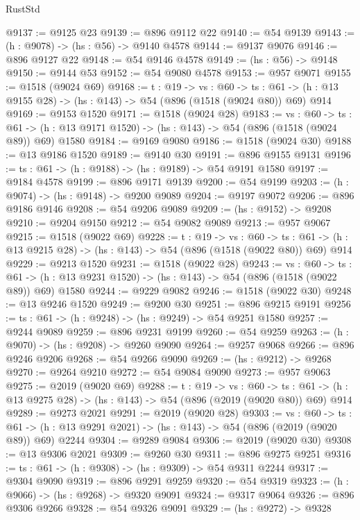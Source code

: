 \begin{lexlean}{RustStd}
\begin{coremodule}
@9137 := @9125 @23
@9139 := @896 @9112 @22
@9140 := @54 @9139
@9143 := (h : @9078) -> (hs : @56) -> @9140 @4578
@9144 := @9137 @9076
@9146 := @896 @9127 @22
@9148 := @54 @9146 @4578
@9149 := (hs : @56) -> @9148
@9150 := @9144 @53
@9152 := @54 @9080 @4578
@9153 := @957 @9071
@9155 := @1518 (@9024 @69)
@9168 := {t : @19} ->
  {vs : @60} ->
  {ts : @61} -> (h : @13 @9155 @28) -> (hs : @143) -> @54 (@896 (@1518 (@9024 @80)) @69) @914
@9169 := @9153 @1520
@9171 := @1518 (@9024 @28)
@9183 := {vs : @60} ->
  {ts : @61} -> (h : @13 @9171 @1520) -> (hs : @143) -> @54 (@896 (@1518 (@9024 @89)) @69) @1580
@9184 := @9169 @9080
@9186 := @1518 (@9024 @30)
@9188 := @13 @9186 @1520
@9189 := @9140 @30
@9191 := @896 @9155 @9131
@9196 := {ts : @61} -> (h : @9188) -> (hs : @9189) -> @54 @9191 @1580
@9197 := @9184 @4578
@9199 := @896 @9171 @9139
@9200 := @54 @9199
@9203 := (h : @9074) -> (hs : @9148) -> @9200 @9089
@9204 := @9197 @9072
@9206 := @896 @9186 @9146
@9208 := @54 @9206 @9089
@9209 := (hs : @9152) -> @9208
@9210 := @9204 @9150
@9212 := @54 @9082 @9089
@9213 := @957 @9067
@9215 := @1518 (@9022 @69)
@9228 := {t : @19} ->
  {vs : @60} ->
  {ts : @61} -> (h : @13 @9215 @28) -> (hs : @143) -> @54 (@896 (@1518 (@9022 @80)) @69) @914
@9229 := @9213 @1520
@9231 := @1518 (@9022 @28)
@9243 := {vs : @60} ->
  {ts : @61} -> (h : @13 @9231 @1520) -> (hs : @143) -> @54 (@896 (@1518 (@9022 @89)) @69) @1580
@9244 := @9229 @9082
@9246 := @1518 (@9022 @30)
@9248 := @13 @9246 @1520
@9249 := @9200 @30
@9251 := @896 @9215 @9191
@9256 := {ts : @61} -> (h : @9248) -> (hs : @9249) -> @54 @9251 @1580
@9257 := @9244 @9089
@9259 := @896 @9231 @9199
@9260 := @54 @9259
@9263 := (h : @9070) -> (hs : @9208) -> @9260 @9090
@9264 := @9257 @9068
@9266 := @896 @9246 @9206
@9268 := @54 @9266 @9090
@9269 := (hs : @9212) -> @9268
@9270 := @9264 @9210
@9272 := @54 @9084 @9090
@9273 := @957 @9063
@9275 := @2019 (@9020 @69)
@9288 := {t : @19} ->
  {vs : @60} ->
  {ts : @61} -> (h : @13 @9275 @28) -> (hs : @143) -> @54 (@896 (@2019 (@9020 @80)) @69) @914
@9289 := @9273 @2021
@9291 := @2019 (@9020 @28)
@9303 := {vs : @60} ->
  {ts : @61} -> (h : @13 @9291 @2021) -> (hs : @143) -> @54 (@896 (@2019 (@9020 @89)) @69) @2244
@9304 := @9289 @9084
@9306 := @2019 (@9020 @30)
@9308 := @13 @9306 @2021
@9309 := @9260 @30
@9311 := @896 @9275 @9251
@9316 := {ts : @61} -> (h : @9308) -> (hs : @9309) -> @54 @9311 @2244
@9317 := @9304 @9090
@9319 := @896 @9291 @9259
@9320 := @54 @9319
@9323 := (h : @9066) -> (hs : @9268) -> @9320 @9091
@9324 := @9317 @9064
@9326 := @896 @9306 @9266
@9328 := @54 @9326 @9091
@9329 := (hs : @9272) -> @9328

\end{coremodule}
\end{lexlean}
